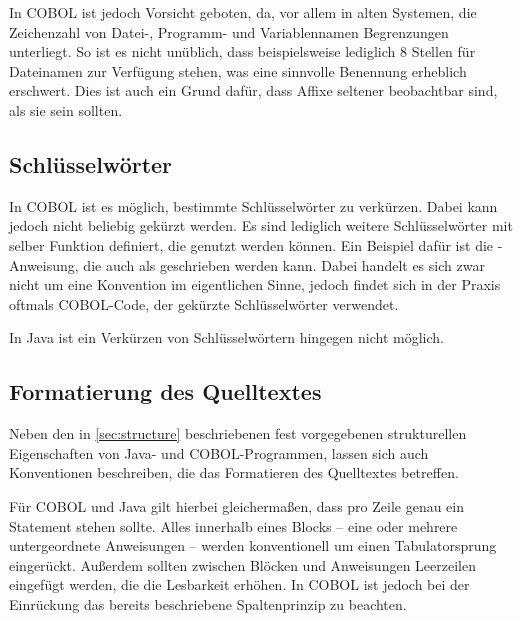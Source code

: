 In COBOL ist jedoch Vorsicht geboten, da, vor allem in alten Systemen, die Zeichenzahl von Datei-, Programm- und Variablennamen Begrenzungen unterliegt. So ist es nicht unüblich, dass beispielsweise lediglich 8 Stellen für Dateinamen zur Verfügung stehen, was eine sinnvolle Benennung erheblich erschwert. Dies ist auch ein Grund dafür, dass Affixe seltener beobachtbar sind, als sie sein sollten.

\subsection*{Schlüsselwörter}
In COBOL ist es möglich, bestimmte Schlüsselwörter zu verkürzen. Dabei kann jedoch nicht beliebig gekürzt werden. Es sind lediglich weitere Schlüsselwörter mit selber Funktion definiert, die genutzt werden können. Ein Beispiel dafür ist die -Anweisung, die auch als  geschrieben werden kann. Dabei handelt es sich zwar nicht um eine Konvention im eigentlichen Sinne, jedoch findet sich in der Praxis oftmals COBOL-Code, der gekürzte Schlüsselwörter verwendet.

In Java ist ein Verkürzen von Schlüsselwörtern hingegen nicht möglich.

\subsection*{Formatierung des Quelltextes}

Neben den in \autoref{sec:structure} beschriebenen fest vorgegebenen strukturellen Eigenschaften von Java- und COBOL-Programmen, lassen sich auch Konventionen beschreiben, die das Formatieren des Quelltextes betreffen.

Für COBOL und Java gilt hierbei gleichermaßen, dass pro Zeile genau ein Statement stehen sollte. Alles innerhalb eines Blocks -- eine oder mehrere untergeordnete Anweisungen -- werden konventionell um einen Tabulatorsprung eingerückt. Außerdem sollten zwischen Blöcken und Anweisungen Leerzeilen eingefügt werden, die die Lesbarkeit erhöhen. In COBOL ist jedoch bei der Einrückung das bereits beschriebene Spaltenprinzip zu beachten.